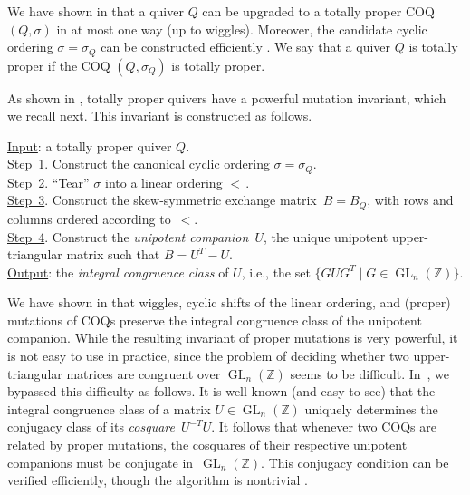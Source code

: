 \documentclass[11pt, letterpaper]{amsart}
\theoremstyle{definition}
\numberwithin{equation}{section}
\def\ZZ{{\mathbb Z}}
\def\GL{{\operatorname{GL}}}
\begin{document}
We have shown in  \cite[Theorem~14.3]{COQ} that 
a quiver $Q$ can be upgraded to a totally proper COQ $(Q,\sigma)$ 
in at most one way (up to wiggles).
Moreover, the candidate cyclic ordering $\sigma=\sigma_Q$ can be constructed efficiently \cite[Algorithm~14.12]{COQ}.
We say that a quiver $Q$ is totally proper if the COQ $(Q, \sigma_Q)$ is totally proper.

As shown in \cite[Corollary 14.2]{COQ}, 
totally proper quivers have a powerful mutation invariant, which we recall next.
This invariant is constructed as follows. 

\smallskip

\noindent
\underline{Input}: a totally proper quiver $Q$. \\
\underline{Step~1}. Construct the canonical cyclic ordering $\sigma=\sigma_Q$. \\
\underline{Step~2}. ``Tear'' $\sigma$ into a linear ordering $<\,$. \\
\underline{Step~3}. Construct the skew-symmetric exchange matrix~$B=B_Q$, with rows and columns ordered according to~$<$. \\
\underline{Step~4}. Construct the \emph{unipotent companion}~$U$, the unique 
unipotent upper-triangular matrix such that $B=U^T - U$. \\
\underline{Output}: the \emph{integral congruence class} of $U$, i.e., 
the set $\{G U G^T \mid G \in \GL_n(\ZZ)\}$.

\smallskip

We have shown in \cite{COQ} that wiggles, cyclic shifts of the linear ordering, 
and (proper) mutations of COQs preserve the integral congruence class of the unipotent companion. \linebreak[3]
While the resulting invariant of proper mutations is very powerful,
it is not easy to use in practice, since 
the problem of deciding whether two upper-triangular matrices %
are congruent over $\GL_n(\ZZ)$ seems to be difficult.  
In~\cite{COQ}, we bypassed this difficulty as follows. 
It is well known (and easy to see) that the integral congruence class of a matrix $U\in \GL_n(\ZZ)$
uniquely determines the conjugacy class of its \emph{cosquare}~$U^{-T} U$.
It follows that whenever two COQs are related by proper mutations,
the cosquares of their respective unipotent companions must be conjugate in~$\GL_n(\ZZ)$. 
This conjugacy condition can be verified efficiently,
though the algorithm is nontrivial \cite{BHJ-opensource, EHO-magma}.
\end{document}
